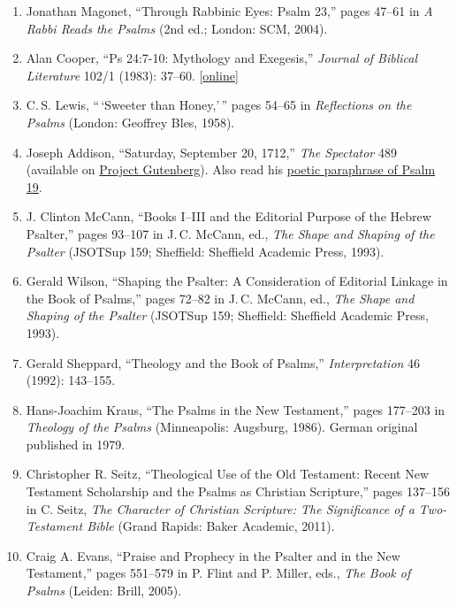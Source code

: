 \documentclass[titlepage]{article}
\begin{document}
\begin{enumerate}
  \item Jonathan Magonet, “Through Rabbinic Eyes: Psalm 23,” pages 47–61 in \emph{A Rabbi Reads the Psalms} (2nd ed.; London: SCM, 2004).

  \item Alan Cooper, ``Ps 24:7-10: Mythology and Exegesis,'' \emph{Journal of Biblical Literature} 102/1 (1983): 37--60. [\href{http://www.jstor.org/stable/3260745}{online}]

  \item C.\,S. Lewis, ``\,`Sweeter than Honey,'\,'' pages 54--65 in \emph{Reflections on the Psalms} (London: Geoffrey Bles, 1958).

  \item Joseph Addison, ``Saturday, September 20, 1712,'' \emph{The Spectator} 489 (available on \href{http://www.gutenberg.org/files/12030/12030-h/SV3/Spectator3.html#section489}{Project Gutenberg}). Also read his \href{http://www.bartleby.com/101/433.html}{poetic paraphrase of Psalm 19}.

  \item J. Clinton McCann, “Books I–III and the Editorial Purpose of the Hebrew Psalter,” pages 93–107 in J.\,C. McCann, ed., \emph{The Shape and Shaping of the Psalter} (JSOTSup 159; Sheffield: Sheffield Academic Press, 1993).

  \item Gerald Wilson, “Shaping the Psalter: A Consideration of Editorial Linkage in the Book of Psalms,” pages 72–82 in J.\,C. McCann, ed., \emph{The Shape and Shaping of the Psalter} (JSOTSup 159; Sheffield: Sheffield Academic Press, 1993).

  \item Gerald Sheppard, “Theology and the Book of Psalms,” \emph{Interpretation} 46 (1992): 143–155.

  \item Hans-Joachim Kraus, “The Psalms in the New Testament,” pages 177–203 in \emph{Theology of the Psalms} (Minneapolis: Augsburg, 1986). German original published in 1979.

  \item Christopher R. Seitz, ``Theological Use of the Old Testament: Recent New Testament Scholarship and the Psalms as Christian Scripture,'' pages 137--156 in C. Seitz, \emph{The Character of Christian Scripture: The Significance of a Two-Testament Bible} (Grand Rapids: Baker Academic, 2011).

  \item Craig A. Evans, “Praise and Prophecy in the Psalter and in the New Testament,” pages 551--579 in P. Flint and P. Miller, eds., \emph{The Book of Psalms} (Leiden: Brill, 2005).


\end{enumerate}
\end{document}
